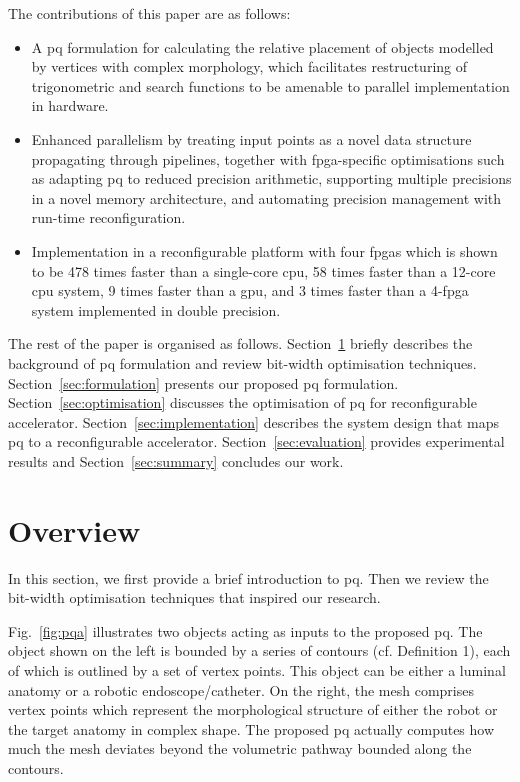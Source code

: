 The contributions of this paper are as follows:
\begin{itemize}
\item A \gls{pq} formulation for calculating the relative placement of objects modelled by vertices with complex morphology, which facilitates
restructuring of trigonometric and search functions to be amenable to parallel implementation in hardware.
\item Enhanced parallelism by treating input points as a novel data structure propagating through pipelines, 
together with \gls{fpga}-specific optimisations such as adapting \gls{pq} to reduced precision arithmetic,
supporting multiple precisions in a novel memory architecture, and automating precision management with run-time reconfiguration.
\item Implementation in a reconfigurable platform with four \gls{fpga}s which is shown to be 478 times faster than a single-core \gls{cpu}, 58 times faster than a 12-core \gls{cpu} system, 9 times faster than a \gls{gpu}, and 3 times faster than a 4-\gls{fpga} system implemented in double precision.
\end{itemize}

The rest of the paper is organised as follows.
Section~\ref{sec:overview} briefly describes the background of \gls{pq} formulation and review bit-width optimisation techniques.
Section~\ref{sec:formulation} presents our proposed \gls{pq} formulation.
Section~\ref{sec:optimisation} discusses the optimisation of \gls{pq} for reconfigurable accelerator.
Section~\ref{sec:implementation} describes the system design that maps \gls{pq} to a reconfigurable accelerator.
Section~\ref{sec:evaluation} provides experimental results and
Section~\ref{sec:summary} concludes our work.

\section{Overview}
\label{sec:overview}

In this section, we first provide a brief introduction to \gls{pq}.
Then we review the bit-width optimisation techniques that inspired our research.

Fig.~\ref{fig:pqa} illustrates two objects acting as inputs to the proposed \gls{pq}. 
The object shown on the left is bounded by a series of contours (cf. Definition 1), each of which is outlined by a set of vertex points. 
This object can be either a luminal anatomy or a robotic endoscope/catheter. 
On the right, the mesh comprises vertex points which represent the morphological structure of either the robot or the target anatomy in complex shape. 
The proposed \gls{pq} actually computes how much the mesh deviates beyond the volumetric pathway bounded along the contours.

